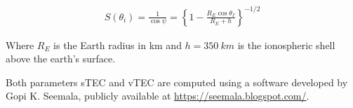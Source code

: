   \begin{align}
    S(\theta_i) = \frac{1}{\cos\psi} = \left\lbrace 1-\frac{R_E\cos\theta_I}{R_E+h}\right\rbrace^{-1/2}
  \end{align}

  Where $R_E$ is the Earth radius in km and $h=\SI{350}{km}$ is the ionospheric shell above the earth's surface.

  Both parameters sTEC and vTEC are computed using a software developed by Gopi K. Seemala, publicly available at \url{https://seemala.blogspot.com/}.

  
     
     
